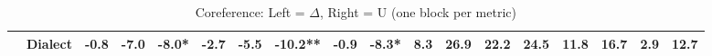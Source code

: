 \begin{table}[h]
{\begin{tabular}{llrrrrrrrrrrrrrrrr}
  & \textbf{Dialect} & \cellcolor{red!1} -0.8 & \cellcolor{red!14} \textbf{-7.0} & \cellcolor{red!16} \textbf{-8.0}* & \cellcolor{red!5} -2.7 & \cellcolor{red!11} \textbf{-5.5} & \cellcolor{red!20} \textbf{-10.2}** & \cellcolor{red!1} -0.9 & \cellcolor{red!16} \textbf{-8.3}* & \cellcolor{blue!1} 8.3 & \cellcolor{blue!5} 26.9 & \cellcolor{blue!4} 22.2 & \cellcolor{blue!4} 24.5 & \cellcolor{blue!2} 11.8 & \cellcolor{blue!3} 16.7 & \cellcolor{blue!0} 2.9 & \cellcolor{blue!2} 12.7 \\
\bottomrule
\end{tabular}}
\caption{Coreference: Left = $\Delta$, Right = U (one block per metric)}\label{tab:coref_dual}
\end{table}